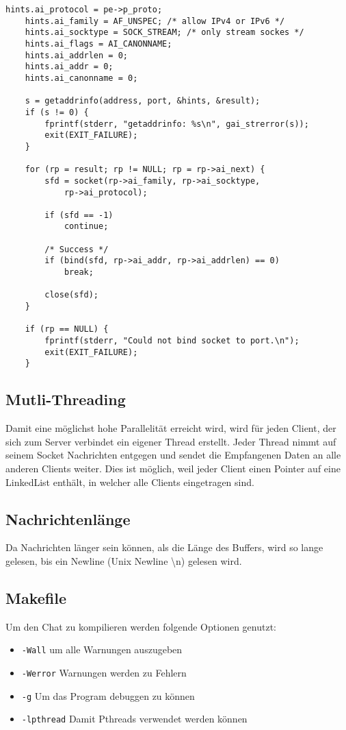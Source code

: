 \documentclass[a4paper]{article}
\begin{document}
\begin{verbatim}
hints.ai_protocol = pe->p_proto;
    hints.ai_family = AF_UNSPEC; /* allow IPv4 or IPv6 */
    hints.ai_socktype = SOCK_STREAM; /* only stream sockes */
    hints.ai_flags = AI_CANONNAME;
    hints.ai_addrlen = 0;
    hints.ai_addr = 0;
    hints.ai_canonname = 0;

    s = getaddrinfo(address, port, &hints, &result);
    if (s != 0) {
        fprintf(stderr, "getaddrinfo: %s\n", gai_strerror(s));
        exit(EXIT_FAILURE);
    }

    for (rp = result; rp != NULL; rp = rp->ai_next) {
        sfd = socket(rp->ai_family, rp->ai_socktype,
            rp->ai_protocol);

        if (sfd == -1)
            continue;

        /* Success */
        if (bind(sfd, rp->ai_addr, rp->ai_addrlen) == 0)
            break;

        close(sfd);
    }

    if (rp == NULL) {
        fprintf(stderr, "Could not bind socket to port.\n");
        exit(EXIT_FAILURE);
    }
\end{verbatim}

\subsection{Mutli-Threading}
Damit eine möglichst hohe Parallelität erreicht wird, wird für jeden Client, der sich zum Server verbindet ein eigener Thread erstellt. Jeder Thread nimmt auf seinem Socket Nachrichten entgegen und sendet die Empfangenen Daten an alle anderen Clients weiter. Dies ist möglich, weil jeder Client einen Pointer auf eine LinkedList enthält, in welcher alle Clients eingetragen sind.

\subsection{Nachrichtenlänge}
Da Nachrichten länger sein können, als die Länge des Buffers, wird so lange gelesen, bis ein Newline (Unix Newline \textbackslash n) gelesen wird.

\subsection{Makefile}
Um den Chat zu kompilieren werden folgende Optionen genutzt:
\begin{itemize}
    \item \texttt{-Wall} um alle Warnungen auszugeben
    \item \texttt{-Werror} Warnungen werden zu Fehlern
    \item \texttt{-g} Um das Program debuggen zu können
    \item \texttt{-lpthread} Damit Pthreads verwendet werden können
\end{itemize}
\end{document}
